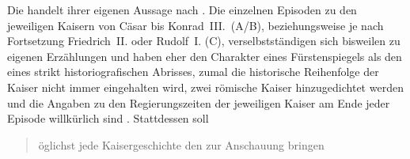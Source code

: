 
Die \citet{kc} handelt ihrer eigenen Aussage nach
\autocite[19--20]{schroeder1895}. Die einzelnen Episoden zu den jeweiligen
Kaisern von Cäsar bis Konrad~III.\ (A/B), beziehungsweise je nach Fortsetzung
Friedrich~II. oder Rudolf~I. (C), verselbstständigen sich bisweilen zu eigenen
Erzählungen und haben eher den Charakter eines Fürstenspiegels als den eines
strikt historiografischen Abrisses, zumal die historische Reihenfolge der
Kaiser nicht immer eingehalten wird, zwei römische Kaiser hinzugedichtet werden
und die Angaben zu den Regierungszeiten der jeweiligen Kaiser am Ende jeder
Episode willkürlich sind \autocite[954--960]{nellmann1983}. Stattdessen soll
\blockcquote[957]{nellmann1983}{öglichst jede Kaisergeschichte
\textelp{} den  \textelp{}
zur Anschauung bringen}.


